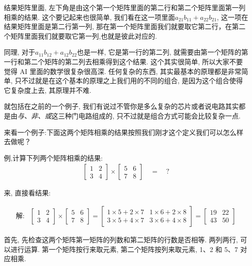 结果矩阵里面, 左下角是由这个第一个矩阵里面的第二行和第二个矩阵里面第一列相乘的结果. 这个要记起来也很简单, 我们看在这一项里面$a_{21}b_{11} + a_{22}b_{21}$, 这一项在结果矩阵里面是第二行第一列, 那在第一个矩阵里面我们就要取它第二行，在第二个矩阵里面我们就要取它第一列,也就是彼此对应的. 

同理, 对于$a_{11}b_{12}+a_{12}b_{22}$也是一样, 它是第一行的第二列, 就需要由第一个矩阵的第一行和第二个矩阵的第二列去相乘得到这个结果. 这个其实很简单, 所以大家不要觉得 AI 里面的数学很复杂很高深. 任何复杂的东西, 其实最基本的原理都是非常简单, 只不过就是在这个基本的原理之上我们用的不同的组合, 是因为这个组合使得它复杂度上去, 其原理并不难. 

就包括在之前的一个例子, 我们有说过不管你是多么复杂的芯片或者说电路其实都是由\textit{与、非、或}这三种门电路组成的, 只不过就是组合方式可能会比较复杂一点. 

来看一个例子:下面这两个矩阵相乘的结果按照我们刚才这个定义我们可以怎么样去做呢？

例,计算下列两个矩阵相乘的结果:
\begin{align*}
  \begin{bmatrix} 1 & 2 \\ 3 & 4  \end{bmatrix} \times \begin{bmatrix} 5 & 6 \\ 7 & 8 \end{bmatrix} \quad = \quad ?
\end{align*}

来, 直接看结果:

\begin{align*}
  \mbox{解:}
  & \begin{bmatrix} 1 & 2 \\ 3 & 4  \end{bmatrix} 
  \times \begin{bmatrix} 5 & 6 \\ 7 & 8 \end{bmatrix} 
  = \begin{bmatrix} 1\times5 + 2\times7 & 1\times6 + 2\times8 \\ 3\times5 + 4\times7 & 3\times6 + 4\times8 \end{bmatrix} 
  = \begin{bmatrix} 19 & 22 \\ 43 & 50 \end{bmatrix}
\end{align*}

首先, 先检查这两个矩阵第一矩阵的列数和第二矩阵的行数是否相等. 两列两行, 可以进行运算. 第一个矩阵按行来取元素, 第二个矩阵按列来取元素, 1、2 和 5、7 对应相乘. 

